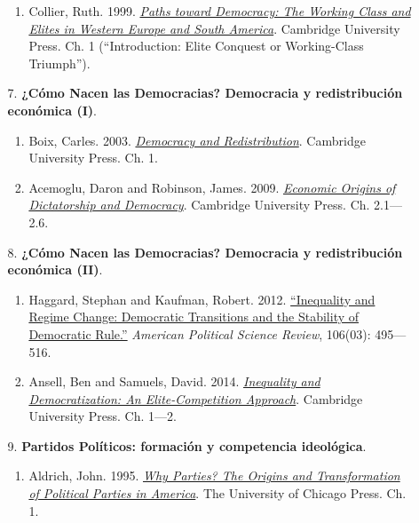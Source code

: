 \documentclass[letterpaper]{article}
\begin{document}
\begin{enumerate}
\begin{enumerate}
\begin{enumerate}
						\item Collier, Ruth. 1999. \href{https://github.com/hbahamonde/Ciencia_Politica_I/raw/master/Readings/Collier.pdf}{\emph{Paths toward Democracy: The Working Class and Elites in Western Europe and South America}}. Cambridge University Press. Ch. 1 (``Introduction: Elite Conquest or Working-Class Triumph'').
					\end{enumerate}

				\item[7.] {\bf ¿C\'omo Nacen las Democracias? Democracia y redistribuci\'on econ\'omica (I)}.  
					\begin{enumerate}
						\item Boix, Carles. 2003. \href{https://github.com/hbahamonde/Ciencia_Politica_I/raw/master/Readings/Boix_2003.pdf}{\emph{Democracy and Redistribution}}. Cambridge University Press. Ch. 1.

						\item Acemoglu, Daron and Robinson, James. 2009. \href{https://github.com/hbahamonde/Ciencia_Politica_I/raw/master/Readings/Acemoglu_Robinson.pdf}{\emph{Economic Origins of Dictatorship and Democracy}}. Cambridge University Press. Ch. 2.1---2.6.
					\end{enumerate}


				\item[8.] {\bf ¿C\'omo Nacen las Democracias? Democracia y redistribuci\'on econ\'omica (II)}.  
					\begin{enumerate}
						\item Haggard, Stephan and Kaufman, Robert. 2012. \href{https://github.com/hbahamonde/Ciencia_Politica_I/raw/master/Readings/Haggard_Kaufman.pdf}{``Inequality and Regime Change: Democratic Transitions and the Stability of Democratic Rule.''} \emph{American Political Science Review}, 106(03): 495---516.

						\item Ansell, Ben and Samuels, David. 2014. \href{https://github.com/hbahamonde/Ciencia_Politica_I/raw/master/Readings/Ansell_Samuels.pdf}{\emph{Inequality and Democratization: An Elite-Competition Approach}}. Cambridge University Press. Ch. 1---2.
					\end{enumerate}

				\item[9.] {\bf Partidos Pol\'iticos: formaci\'on y competencia ideol\'ogica}.
					\begin{enumerate}
						\item Aldrich, John. 1995. \href{https://github.com/hbahamonde/Ciencia_Politica_I/raw/master/Readings/Aldrich_1995.pdf}{\emph{Why Parties? The Origins and Transformation of Political Parties in America}}. The University of Chicago Press. Ch. 1.
						

\end{enumerate}
\end{enumerate}
\end{enumerate}
\end{document}
